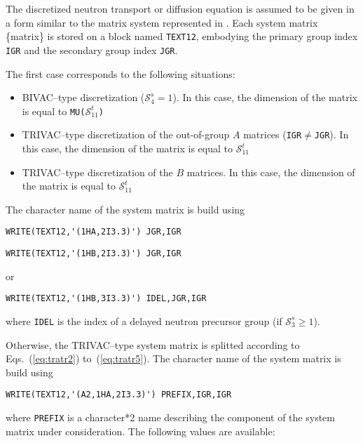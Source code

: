 The discretized neutron transport or diffusion equation is assumed to be given in a form similar to the matrix system represented in .
Each system matrix \{matrix\} is stored on a block named {\tt TEXT12}, embodying the primary group index {\tt IGR} and the secondary group index {\tt JGR}.

\vskip 0.2cm

The first case corresponds to the following situations:
\begin{itemize}
\item BIVAC--type discretization ($\mathcal{S}^{s}_{4}=1$). In this case, the dimension of
the matrix is equal to {\tt MU(}$\mathcal{S}^{t}_{11}${\tt)}
\item TRIVAC--type discretization of the out-of-group $A$ matrices ({\tt IGR}$\ne${\tt JGR}).
In this case, the dimension of
the matrix is equal to $\mathcal{S}^{t}_{11}$
\item TRIVAC--type discretization of the $B$ matrices. In this case, the dimension of
the matrix is equal to $\mathcal{S}^{t}_{11}$
\end{itemize}
The character name of the system matrix is build using

\begin{verbatim}
WRITE(TEXT12,'(1HA,2I3.3)') JGR,IGR
\end{verbatim}

\vskip 0.1cm

\begin{verbatim}
WRITE(TEXT12,'(1HB,2I3.3)') JGR,IGR
\end{verbatim}

\noindent or

\begin{verbatim}
WRITE(TEXT12,'(1HB,3I3.3)') IDEL,JGR,IGR
\end{verbatim}

\noindent where {\tt IDEL} is the index of a delayed neutron precursor group
(if $\mathcal{S}^{s}_{3} \ge 1$).

\vskip 0.2cm

Otherwise, the TRIVAC--type system matrix is splitted according to Eqs.~(\ref{eq:tratr2})
to~(\ref{eq:tratr5}). The character name of the system matrix is build using

\begin{verbatim}
WRITE(TEXT12,'(A2,1HA,2I3.3)') PREFIX,IGR,IGR
\end{verbatim}

\noindent where {\tt PREFIX} is a character*2 name describing the component
of the system matrix under consideration. The following values are available:

